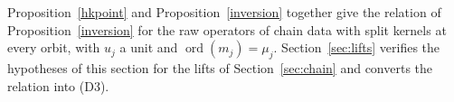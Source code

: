 Proposition~\ref{hkpoint} and Proposition~\ref{inversion} together give the relation of Proposition~\ref{inversion} for the raw operators of chain data with split kernels at every orbit, with $u_j$ a unit and $\operatorname{ord}(m_j)=\mu_j$. Section~\ref{sec:lifts} verifies the hypotheses of this section for the lifts of Section~\ref{sec:chain} and converts the relation into (D3).

